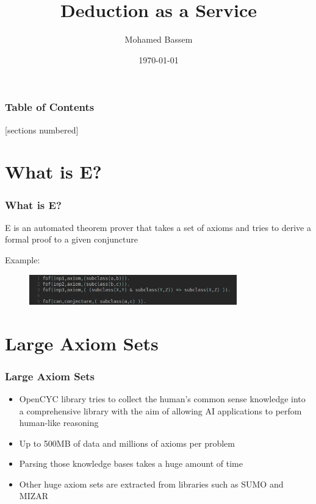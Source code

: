 \documentclass[10pt]{beamer}
\title{Deduction as a Service}
\subtitle{}
\date{\today}
\author{Mohamed Bassem}
\institute{German University in Cairo}
\begin{document}
\maketitle

\begin{frame}
  \frametitle{Table of Contents}
  [sections numbered]
  \tableofcontents[
    hideallsubsections,
  ]
\end{frame}

\section{What is E?}
\begin{frame}[fragile]
  \frametitle{What is E?}

  E is an automated theorem prover that takes a set of axioms and tries to derive a formal proof to a given conjuncture

  \pause{}
  Example:
  \begin{figure}
    \includegraphics[width=90mm]{imgs/SampleAxioms.png}
  \end{figure}
\end{frame}


\section{Large Axiom Sets}
\begin{frame}[fragile]
  \frametitle{Large Axiom Sets}
  \begin{itemize}[<+- | alert@+>]
    \item OpenCYC library tries to collect the human's common sense knowledge into a comprehensive library with the aim of allowing AI applications to perfom human-like reasoning\cite{wiki:OpenCYC}
      \item Up to 500MB of data and millions of axioms per problem
      \item Parsing those knowledge bases takes a huge amount of time
      \item Other huge axiom sets are extracted from libraries such as SUMO and MIZAR
  \end{itemize}
\end{frame}
\end{document}
